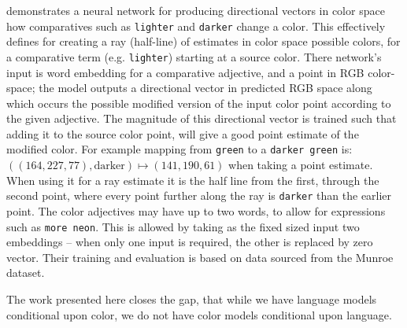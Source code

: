 \documentclass[]{clv3}
\newcommand{\textcite}{\citet}
\newcommand{\natlang}[1]{\texttt{#1}}
\begin{document}
\textcite{acl2018WinnLighter} demonstrates a neural network for producing directional vectors in color space how comparatives such as \natlang{lighter} and \natlang{darker} change a color.
This effectively defines for creating a ray (half-line) of estimates in color space possible colors, for a comparative term (e.g. \natlang{lighter}) starting at a source color.
There network's input is  word embedding for a comparative adjective, and a point in RGB color-space; the model outputs a directional vector in predicted RGB space along which occurs the possible modified version of the input color point according to the given adjective.
The magnitude of this directional vector is trained such that adding it to the source color point, will give a good point estimate of the modified color.
For example mapping from \natlang{green} to a \natlang{darker green} is: $((164,227,77), \text{darker}) \mapsto (141, 190, 61)$ when taking a point estimate.
When using it for a ray estimate it is the half line from the first, through the second point, where every point further along the ray is \natlang{darker} than the earlier point.
The color adjectives may have up to two words, to allow for expressions such as \natlang{more neon}.
This is allowed by taking as the fixed sized input two embeddings -- when only one input is required, the other is replaced by zero vector.
Their training and evaluation is based on data sourced from the  Munroe dataset.


The work presented here closes the gap, that while we have language models conditional upon color,
we do not have color models conditional upon language.
\end{document}
